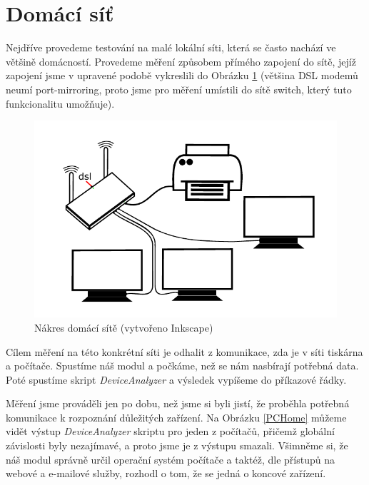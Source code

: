 \documentclass[thesis=B,czech,hidelinks]{FITthesis}[2019/03/21]
\begin{document}
    \section{Domácí síť}
    Nejdříve provedeme testování na malé lokální síti, která se často nachází ve většině domácností. Provedeme měření způsobem přímého zapojení do sítě, jejíž zapojení jsme v upravené podobě vykreslili do Obrázku \ref{HomeNetwork} (většina DSL modemů neumí port-mirroring, proto jsme pro měření umístili do sítě switch, který tuto funkcionalitu umožňuje).
    
    
    \begin{figure}[h]
        \centering
        \includegraphics[scale=0.9]{HomeNetwork.pdf}
        \caption[Nákres domácí sítě]{Nákres domácí sítě (vytvořeno Inkscape) }
        \label{HomeNetwork}
    \end{figure}
    
    Cílem měření na této konkrétní síti je odhalit z komunikace, zda je v síti tiskárna a počítače. Spustíme náš modul a počkáme, než se nám nasbírají potřebná data. Poté spustíme skript \emph{DeviceAnalyzer} a výsledek vypíšeme do příkazové řádky. 
    
    Měření jsme prováděli jen po dobu, než jsme si byli jistí, že proběhla potřebná komunikace k rozpoznání důležitých zařízení. Na Obrázku \ref{PCHome} můžeme vidět výstup \emph{DeviceAnalyzer} skriptu pro jeden z počítačů, přičemž globální závislosti byly nezajímavé, a proto jsme je z výstupu smazali. Všimněme si, že náš modul správně určil operační systém počítače a taktéž, dle přístupů na webové a e-mailové služby, rozhodl o tom, že se jedná o koncové zařízení. 
    
\end{document}
